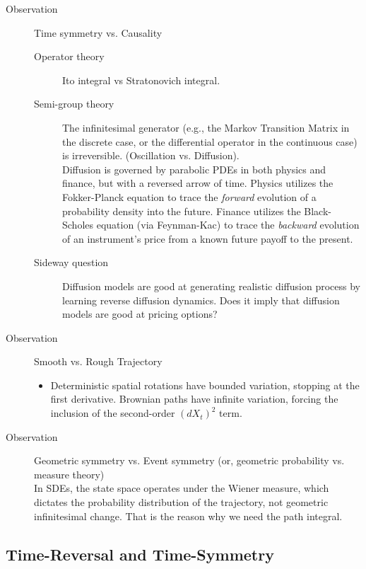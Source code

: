 \documentclass{article}
\begin{document}
\begin{description}
    \item[Observation] Time symmetry vs. Causality
          \begin{description}
              \item[Operator theory] Ito integral vs Stratonovich integral.
              \item[Semi-group theory] The infinitesimal generator (e.g., the Markov Transition Matrix in the discrete case, or the differential operator in the continuous case) is irreversible. (Oscillation vs. Diffusion). \\
                    Diffusion is governed by parabolic PDEs in both physics and finance, but with a reversed arrow of time. Physics utilizes the Fokker-Planck equation to trace the \textit{forward} evolution of a probability density into the future. Finance utilizes the Black-Scholes equation (via Feynman-Kac) to trace the \textit{backward} evolution of an instrument's price from a known future payoff to the present.
              \item[Sideway question] Diffusion models are good at generating realistic diffusion process by learning reverse diffusion dynamics. Does it imply that diffusion models are good at pricing options?
          \end{description}
    \item[Observation] Smooth vs. Rough Trajectory
          \begin{itemize}
              \item Deterministic spatial rotations have bounded variation, stopping at the first derivative. Brownian paths have infinite variation, forcing the inclusion of the second-order $(dX_t)^2$ term.
          \end{itemize}
    \item[Observation] Geometric symmetry vs. Event symmetry (or, geometric probability vs. measure theory) ~\\
          In SDEs, the state space operates under the Wiener measure, which dictates the probability distribution of the trajectory, not geometric infinitesimal change. That is the reason why we need the path integral.
\end{description}


\subsection{Time-Reversal and Time-Symmetry}
\end{document}
